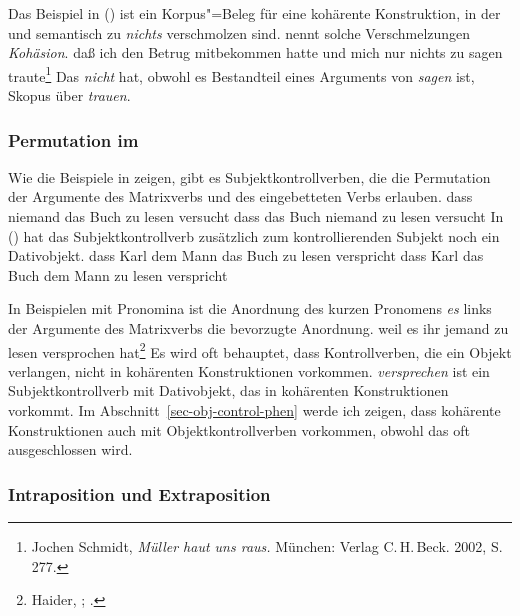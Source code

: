 Das Beispiel in () ist ein Korpus"=Beleg für eine kohärente Konstruktion, in der
 und  semantisch zu \emph{nichts} verschmolzen sind.
\citet[{\S}\,80]{Bech55a} nennt solche Verschmelzungen \emph{Kohäsion}.
\ea{}
\label{bsp-trauen-kohaerent}
daß ich den Betrug mitbekommen hatte und mich nur nichts zu sagen traute\footnote{
        Jochen Schmidt, \emph{Müller haut uns raus.} München: Verlag C.\,H.\,Beck. 2002, S.\,277.%
}
\z
Das \emph{nicht} hat, obwohl es Bestandteil eines Arguments von \emph{sagen} ist,
Skopus über \emph{trauen}.


\subsubsection{Permutation im \mf}
\label{sec-subj-contr-perm-mf}

Wie die Beispiele in  zeigen, gibt es Subjektkontrollverben, die die Permutation
der Argumente des Matrixverbs und des eingebetteten Verbs erlauben.
\eal
\ex dass niemand das Buch zu lesen versucht
\ex dass das Buch niemand zu lesen versucht
\zl
In () hat das Subjektkontrollverb zusätzlich zum kontrollierenden Subjekt noch ein Dativobjekt.
\eal{}
\ex dass Karl dem Mann das Buch zu lesen verspricht
\ex dass Karl das Buch dem Mann zu lesen verspricht
\zl

\noindent
In Beispielen mit Pronomina ist die Anordnung des kurzen Pronomens \emph{es}
links der Argumente des Matrixverbs die bevorzugte Anordnung.
\ea
\label{ex-weil-es-ihm-jemand-zu-lesen-versprochen-hat-zwei}
weil    es       ihr       jemand   zu lesen versprochen hat\footnote{
Haider, \citeyear[]{Haider86c}; \citeyear[]{Haider90b}.
}
\z
Es wird oft behauptet, dass Kontrollverben, die ein Objekt verlangen, nicht in kohärenten
Konstruktionen vorkommen.
\emph{versprechen} ist ein Subjektkontrollverb mit Dativobjekt, das
in kohärenten Konstruktionen vorkommt.
Im Abschnitt~\ref{sec-obj-control-phen} werde ich zeigen, dass kohärente Konstruktionen
auch mit Objektkontrollverben vorkommen, obwohl das oft ausgeschlossen wird.

\subsubsection{Intraposition und Extraposition}
\label{sec-subj-contr-ie}

